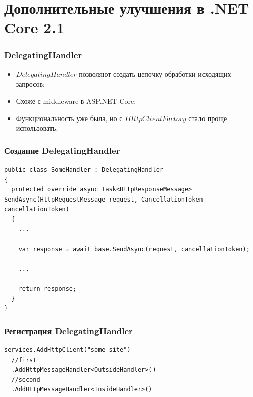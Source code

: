 \documentclass{beamer}
\begin{document}
\section{Дополнительные улучшения в .NET Core 2.1}
\begin{frame}
\frametitle{\href{https://docs.microsoft.com/en-us/dotnet/api/system.net.http.delegatinghandler?view=netcore-2.2}{DelegatingHandler}}
\begin{itemize}
\item $DelegatingHandler$ позволяют создать цепочку обработки исходящих запросов;
\item Схоже с middleware в ASP.NET Core;
\item Функциональность уже была, но с $IHttpClientFactory$ стало проще использовать.
\end{itemize}
\end{frame}

\begin{frame}[fragile]
\frametitle{Создание DelegatingHandler}
\begin{lstlisting}
public class SomeHandler : DelegatingHandler
{
  protected override async Task<HttpResponseMessage> SendAsync(HttpRequestMessage request, CancellationToken cancellationToken)
  {
    ...
        
    var response = await base.SendAsync(request, cancellationToken);

    ...
        
    return response;        
  }
}
\end{lstlisting}
\end{frame}

\begin{frame}[fragile]
\frametitle{Регистрация DelegatingHandler}
\begin{lstlisting}
services.AddHttpClient("some-site")
  //first
  .AddHttpMessageHandler<OutsideHandler>()
  //second
  .AddHttpMessageHandler<InsideHandler>()
\end{lstlisting}
\end{frame}
\end{document}
